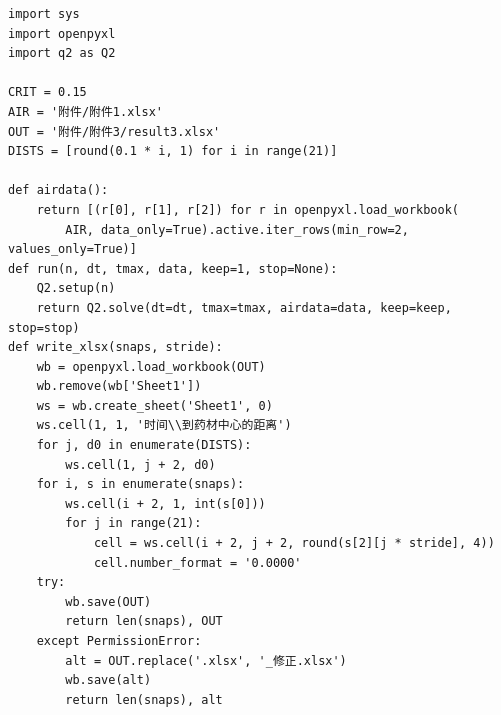 \documentclass[12pt,a4paper]{article}
\begin{document}
\begin{lstlisting}
import sys
import openpyxl
import q2 as Q2

CRIT = 0.15                     
AIR = '附件/附件1.xlsx'
OUT = '附件/附件3/result3.xlsx'
DISTS = [round(0.1 * i, 1) for i in range(21)]

def airdata():
    return [(r[0], r[1], r[2]) for r in openpyxl.load_workbook(
        AIR, data_only=True).active.iter_rows(min_row=2, values_only=True)]
def run(n, dt, tmax, data, keep=1, stop=None):
    Q2.setup(n)
    return Q2.solve(dt=dt, tmax=tmax, airdata=data, keep=keep, stop=stop)
def write_xlsx(snaps, stride):
    wb = openpyxl.load_workbook(OUT)
    wb.remove(wb['Sheet1'])                    
    ws = wb.create_sheet('Sheet1', 0)
    ws.cell(1, 1, '时间\\到药材中心的距离')
    for j, d0 in enumerate(DISTS):
        ws.cell(1, j + 2, d0)
    for i, s in enumerate(snaps):
        ws.cell(i + 2, 1, int(s[0]))
        for j in range(21):
            cell = ws.cell(i + 2, j + 2, round(s[2][j * stride], 4))
            cell.number_format = '0.0000'
    try:
        wb.save(OUT)
        return len(snaps), OUT
    except PermissionError:            
        alt = OUT.replace('.xlsx', '_修正.xlsx')
        wb.save(alt)
        return len(snaps), alt


\end{lstlisting}
\end{document}
